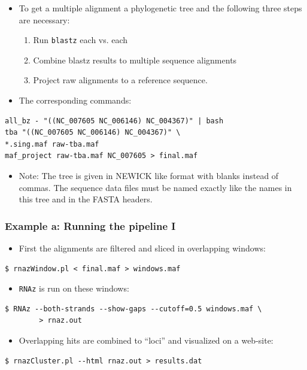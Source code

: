 \documentclass[a4paper]{article}
\newcommand{\frametitle}[1]{\subsubsection{#1}}
\begin{document}
  \begin{itemize}
  \item To get a multiple alignment a phylogenetic tree and the following
    three steps are necessary:
    \begin{enumerate}
      \item Run \texttt{blastz} each vs. each
      \item Combine blastz results to multiple sequence alignments
      \item Project raw alignments to a reference sequence.
    \end{enumerate}
  \item The corresponding commands:
  \end{itemize}
\small
\begin{verbatim}
all_bz - "((NC_007605 NC_006146) NC_004367)" | bash
tba "((NC_007605 NC_006146) NC_004367)" \
*.sing.maf raw-tba.maf
maf_project raw-tba.maf NC_007605 > final.maf
\end{verbatim}
\normalsize
\begin{itemize}
\item Note: The tree is given in NEWICK like format with blanks instead
  of commas. The sequence data files must be named exactly like the names
  in this tree and in the FASTA headers.
\end{itemize}




  \frametitle{Example a: Running the pipeline I}

  \begin{itemize}
  \item First the alignments are filtered and sliced in overlapping windows:
  \end{itemize}
\small
\begin{verbatim}
$ rnazWindow.pl < final.maf > windows.maf
\end{verbatim}
\normalsize
  \begin{itemize}
  \item \texttt{RNAz} is run on these windows:
  \end{itemize}
\small
\begin{verbatim}
$ RNAz --both-strands --show-gaps --cutoff=0.5 windows.maf \
        > rnaz.out
\end{verbatim}
\normalsize
\begin{itemize}
  \item Overlapping hits are combined to ``loci'' and visualized on a web-site:
  \end{itemize}
\small
\begin{verbatim}
$ rnazCluster.pl --html rnaz.out > results.dat
\end{verbatim}
\normalsize
\end{document}
